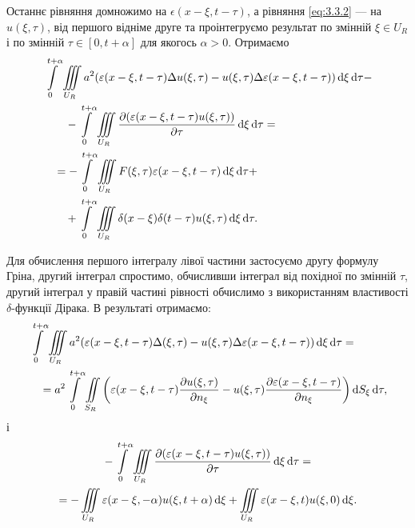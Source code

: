 Останнє рівняння домножимо на $\epsilon(x - \xi, t - \tau)$, а рівняння \eqref{eq:3.3.2} --- на $u(\xi, \tau)$, від першого відніме друге та проінтегруємо результат по змінній $\xi \in U_R$ і по змінній $\tau \in [0, t + \alpha]$ для якогось $\alpha > 0$. Отримаємо
\begin{equation}
	\begin{aligned}
		& \Int_0^{t + \alpha} \Iiint_{U_R} a^2 (\epsilon(x - \xi, t - \tau) \Delta u(\xi, \tau) - u(\xi, \tau) \Delta \epsilon(x - \xi, t - \tau)) \diff \xi \diff \tau - \\
		& \qquad - \Int_0^{t + \alpha} \Iiint_{U_R} \frac{\partial (\epsilon(x - \xi, t - \tau) u(\xi, \tau))}{\partial \tau} \diff \xi \diff \tau = \\
		& \quad = - \Int_0^{t + \alpha} \Iiint_{U_R} F(\xi, \tau) \epsilon(x - \xi, t - \tau) \diff \xi \diff \tau + \\
		& \qquad + \Int_0^{t + \alpha} \Iiint_{U_R} \delta(x - \xi) \delta(t - \tau) u(\xi, \tau) \diff \xi \diff \tau.
	\end{aligned}
\end{equation}


Для обчислення першого інтегралу лівої частини застосуємо другу формулу Гріна, другий інтеграл спростимо, обчисливши інтеграл від похідної по змінній $\tau$, другий інтеграл у правій частині рівності обчислимо з використанням властивості $\delta$-функції Дірака. В результаті отримаємо:
\begin{equation}
	\begin{aligned}
		& \displaystyle\int\limits_0^{t + \alpha} \displaystyle\iiint\limits_{U_R} a^2 (\varepsilon(x - \xi, t - \tau) \Delta(\xi, \tau) - u(\xi, \tau) \Delta \varepsilon(x - \xi, t - \tau)) \mathop{}\!\mathrm{d} \xi \mathop{}\!\mathrm{d} \tau = \\
		& \quad = a^2 \displaystyle\int\limits_0^{t + \alpha} \displaystyle\iint\limits_{S_R} \left( \varepsilon(x - \xi, t - \tau) \frac{\partial u(\xi, \tau)}{\partial n_\xi} - u(\xi, \tau) \frac{\partial \varepsilon(x - \xi, t - \tau)}{\partial n_\xi} \right) \mathop{}\!\mathrm{d} S_\xi \mathop{}\!\mathrm{d} \tau,
	\end{aligned}
\end{equation}
і
\begin{multline}
	- \displaystyle\int\limits_0^{t + \alpha} \displaystyle\iiint\limits_{U_R} \frac{\partial (\varepsilon(x - \xi, t - \tau) u(\xi, \tau))}{\partial \tau} \mathop{}\!\mathrm{d} \xi \mathop{}\!\mathrm{d} \tau = \\
	= - \displaystyle\iiint\limits_{U_R} \varepsilon(x - \xi, -\alpha) u(\xi, t + \alpha) \mathop{}\!\mathrm{d} \xi + \displaystyle\iiint\limits_{U_R} \varepsilon(x - \xi, t) u(\xi, 0) \mathop{}\!\mathrm{d} \xi.
\end{multline}

